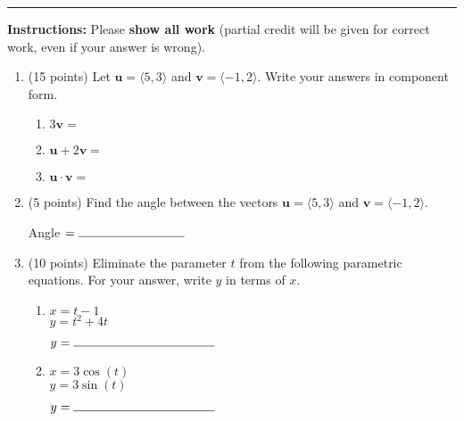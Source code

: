 \documentclass[11pt]{article}
\begin{document}
\Large


\medskip\hrule
\vspace{10pt}

\noindent \textbf{Instructions:} Please \textbf{show all work} (partial credit will be given for correct work, even if your answer is wrong).

\vspace{10pt}

\begin{enumerate}

\item (15 points) Let $\textbf{u}= \langle 5,3 \rangle$ and $\textbf{v}=\langle -1,2 \rangle$. Write your answers in component form.

\begin{enumerate}[itemsep=10pt, label={\alph*)}]
    \item $\displaystyle 3\textbf{v} = $
    \item $\displaystyle \textbf{u} + 2\textbf{v} = $
    \item $\displaystyle \textbf{u} \cdot \textbf{v} = $
\end{enumerate}
\vspace{10pt}

\item (5 points) Find the angle between the vectors $\textbf{u}= \langle 5,3 \rangle$ and $\textbf{v}=\langle -1,2 \rangle$.
\vspace{60pt}
\begin{flushright}
Angle $= \rule{3cm}{0.4pt}$
\end{flushright}

\vspace{10pt}

\item (10 points) Eliminate the parameter $t$ from the following parametric equations. For your answer, write $y$ in terms of $x$.

\begin{enumerate}[itemsep=20pt, label={\alph*)}]
\item $x = t - 1$ \\
$y = t^2 +4t$
\vspace{50pt}
\begin{flushright}
$y = \rule{4cm}{0.4pt}$
\end{flushright}
\item $x = 3\cos(t)$ \\
$y = 3\sin(t)$
\vspace{50pt}
\begin{flushright}
$y = \rule{4cm}{0.4pt}$
\end{flushright}
\end{enumerate}


\end{enumerate}
\end{document}
